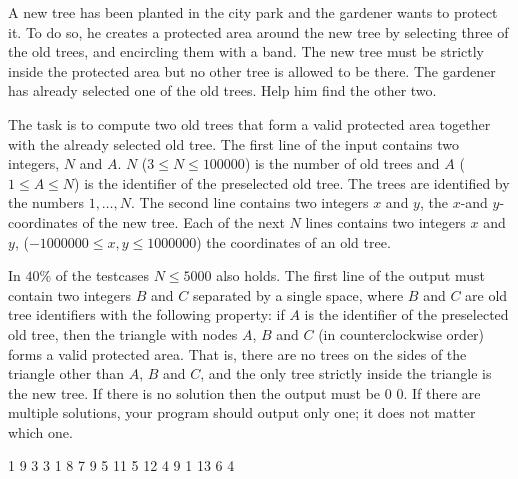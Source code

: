 





A new tree has been planted in the city park and the gardener wants to protect it. To do so, he creates a protected area around the new tree by selecting three of the old trees, and encircling them with a band. The new tree must be strictly inside the protected area but no other tree is allowed to be there. The gardener has already selected one of the old trees. Help him find the other two.

The task is to compute two old trees that form a valid protected area together with the already selected old tree.
The first line of the input contains two integers, $N$ and $A$. $N$ ($3 \leq N \leq 100000$) is the number of old trees and $A$ ($1 \leq A \leq N$) is the identifier of the preselected old tree. The trees are identified by the numbers $1,\ldots,N$. The second line contains two integers $x$ and $y$, the $x$-and $y$-coordinates of the new tree. Each of the next $N$ lines contains two integers $x$ and $y$, ($-1000000 \leq x,y \leq 1000000$) the coordinates of an old tree.

\bigskip
In $40 \%$ of the testcases $N \leq 5000$ also holds.
The first line of the output must contain two integers $B$ and $C$ separated by a single space, where $B$ and $C$ are old tree identifiers with the following property: if $A$ is the identifier of the preselected old tree, then the triangle with nodes $A$, $B$ and $C$ (in counterclockwise order) forms a valid protected area. That is, there are no trees on the sides of the triangle other than $A$, $B$ and $C$, and the only tree strictly inside the triangle is the new tree.
If there is no solution then the output must be 0 0. If there are multiple solutions, your program should output only one; it does not matter which one.

 1
9 3
3 1
8 7
9 5
11 5
12 4
9 1
13 6
 4
\sampleCOMMENT

\sampleEND
\bigskip


